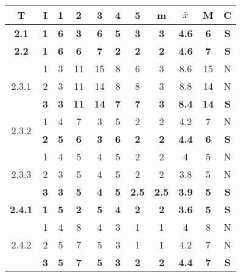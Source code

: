 \documentclass[11pt,a4paper,spanish,twoside]{report}
\begin{document}
\begin{table}[!h]
\centering
  \begin{tabular}{|c|c||c|c|c|c|c||c|c|c||c|}
    \hline
    \textbf{T} & \textbf{I} & \textbf{1} &
    \textbf{2} & \textbf{3} & \textbf{4} & \textbf{5} & \textbf{m}
    &\textbf{$\bar{x}$} &\textbf{M} & \textbf{C}\\
    \hline \hline
    \textbf{2.1} & \textbf{1} & \textbf{6} & \textbf{3} & \textbf{6} & \textbf{5} & \textbf{3} & \textbf{3} & \textbf{4.6} & \textbf{6} & \textbf{S}\\
    \hline

    \textbf{2.2} & \textbf{1} & \textbf{6} & \textbf{6} & \textbf{7} & \textbf{2} & \textbf{2} & \textbf{2} & \textbf{4.6} & \textbf{7} & \textbf{S}\\
    \hline

    \multirow{3}{*}{2.3.1}& 1 & 3 & 11 & 15 & 8 & 6 & 3 & 8.6 & 15 & N \\
    & 2 & 3 & 11 & 14 & 8 & 8 & 3 & 8.8 & 14 & N \\
    & \textbf{3} & \textbf{3} & \textbf{11} & \textbf{14} & \textbf{7} & \textbf{7} & \textbf{3} & \textbf{8.4} & \textbf{14} & \textbf{S} \\
    \hline

    \multirow{2}{*}{2.3.2} & 1 & 4 & 7 & 3 & 5 & 2 & 2 & 4.2 & 7 & N \\
    & \textbf{2} & \textbf{5} & \textbf{6} & \textbf{3} & \textbf{6} & \textbf{2} & \textbf{2} & \textbf{4.4} & \textbf{6} & \textbf{S} \\
    \hline

    \multirow{3}{*}{2.3.3}& 1 & 4 & 5 & 4 & 5 & 2 & 2 & 4 & 5 & N \\
    & 2 & 3 & 5 & 4 & 5 & 2 & 2 & 3.8 & 5 & N \\
    & \textbf{3} & \textbf{3} & \textbf{5} & \textbf{4} & \textbf{5} &
    \textbf{2.5} & \textbf{2.5} & \textbf{3.9} & \textbf{5} & \textbf{S} \\
    \hline

    \textbf{2.4.1} & \textbf{1} & \textbf{5} & \textbf{2} & \textbf{5} & \textbf{4} & \textbf{2} & \textbf{2} & \textbf{3.6} & \textbf{5} & \textbf{S} \\
    \hline

    \multirow{3}{*}{2.4.2}& 1 & 4 & 8 & 4 & 3 & 1 & 1 & 4 & 8 & N \\
    & 2 & 5 & 7 & 5 & 3 & 1 & 1 & 4.2 & 7 & N \\
    & \textbf{3} & \textbf{5} & \textbf{7} & \textbf{5} & \textbf{3} & \textbf{2} & \textbf{2} & \textbf{4.4} & \textbf{7} & \textbf{S} \\
    \hline


\end{tabular}
\end{table}
\end{document}
